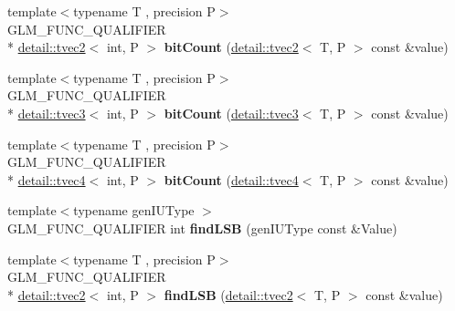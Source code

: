 \begin{DoxyCompactItemize}
\item 
\hypertarget{namespaceglm_a573d6ea294a27e158525a1558eac5492}{{\footnotesize template$<$typename T , precision P$>$ }\\G\-L\-M\-\_\-\-F\-U\-N\-C\-\_\-\-Q\-U\-A\-L\-I\-F\-I\-E\-R \\*
\hyperlink{structglm_1_1detail_1_1tvec2}{detail\-::tvec2}$<$ int, P $>$ {\bfseries bit\-Count} (\hyperlink{structglm_1_1detail_1_1tvec2}{detail\-::tvec2}$<$ T, P $>$ const \&value)}\label{namespaceglm_a573d6ea294a27e158525a1558eac5492}

\item 
\hypertarget{namespaceglm_a2f5b97b2cca4741488209eac160ef903}{{\footnotesize template$<$typename T , precision P$>$ }\\G\-L\-M\-\_\-\-F\-U\-N\-C\-\_\-\-Q\-U\-A\-L\-I\-F\-I\-E\-R \\*
\hyperlink{structglm_1_1detail_1_1tvec3}{detail\-::tvec3}$<$ int, P $>$ {\bfseries bit\-Count} (\hyperlink{structglm_1_1detail_1_1tvec3}{detail\-::tvec3}$<$ T, P $>$ const \&value)}\label{namespaceglm_a2f5b97b2cca4741488209eac160ef903}

\item 
\hypertarget{namespaceglm_a8c668fc78e5881f3ae8b93a997ce8d22}{{\footnotesize template$<$typename T , precision P$>$ }\\G\-L\-M\-\_\-\-F\-U\-N\-C\-\_\-\-Q\-U\-A\-L\-I\-F\-I\-E\-R \\*
\hyperlink{structglm_1_1detail_1_1tvec4}{detail\-::tvec4}$<$ int, P $>$ {\bfseries bit\-Count} (\hyperlink{structglm_1_1detail_1_1tvec4}{detail\-::tvec4}$<$ T, P $>$ const \&value)}\label{namespaceglm_a8c668fc78e5881f3ae8b93a997ce8d22}

\item 
\hypertarget{namespaceglm_a984d0192bd95085d8efb0a1a00a4e6d9}{{\footnotesize template$<$typename gen\-I\-U\-Type $>$ }\\G\-L\-M\-\_\-\-F\-U\-N\-C\-\_\-\-Q\-U\-A\-L\-I\-F\-I\-E\-R int {\bfseries find\-L\-S\-B} (gen\-I\-U\-Type const \&Value)}\label{namespaceglm_a984d0192bd95085d8efb0a1a00a4e6d9}

\item 
\hypertarget{namespaceglm_ae037356ab3b0ac098723dfe091a93753}{{\footnotesize template$<$typename T , precision P$>$ }\\G\-L\-M\-\_\-\-F\-U\-N\-C\-\_\-\-Q\-U\-A\-L\-I\-F\-I\-E\-R \\*
\hyperlink{structglm_1_1detail_1_1tvec2}{detail\-::tvec2}$<$ int, P $>$ {\bfseries find\-L\-S\-B} (\hyperlink{structglm_1_1detail_1_1tvec2}{detail\-::tvec2}$<$ T, P $>$ const \&value)}\label{namespaceglm_ae037356ab3b0ac098723dfe091a93753}


\end{DoxyCompactItemize}
